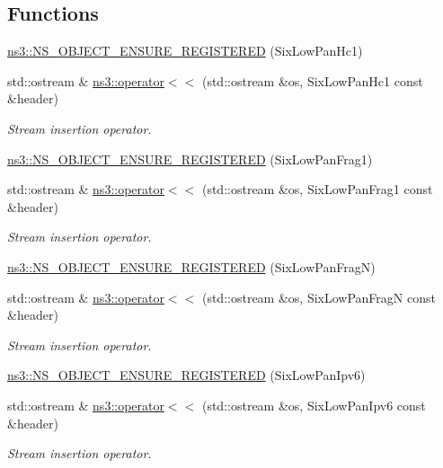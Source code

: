 \subsection*{Functions}
\begin{DoxyCompactItemize}
\item 
\hyperlink{namespacens3_a79c7e17c64bcdec1c8a80aef4aec84e7}{ns3\+::\+N\+S\+\_\+\+O\+B\+J\+E\+C\+T\+\_\+\+E\+N\+S\+U\+R\+E\+\_\+\+R\+E\+G\+I\+S\+T\+E\+R\+ED} (Six\+Low\+Pan\+Hc1)
\item 
std\+::ostream \& \hyperlink{namespacens3_a3206dad5b9c2d4d8bfae82c0a4eef647}{ns3\+::operator$<$$<$} (std\+::ostream \&os, Six\+Low\+Pan\+Hc1 const \&header)
\begin{DoxyCompactList}\small\item\em Stream insertion operator. \end{DoxyCompactList}\item 
\hyperlink{namespacens3_a80ca589a66bcf484fe57e0e4f27bc845}{ns3\+::\+N\+S\+\_\+\+O\+B\+J\+E\+C\+T\+\_\+\+E\+N\+S\+U\+R\+E\+\_\+\+R\+E\+G\+I\+S\+T\+E\+R\+ED} (Six\+Low\+Pan\+Frag1)
\item 
std\+::ostream \& \hyperlink{namespacens3_a0d19c4dfea04a3666706bfda9975e2bf}{ns3\+::operator$<$$<$} (std\+::ostream \&os, Six\+Low\+Pan\+Frag1 const \&header)
\begin{DoxyCompactList}\small\item\em Stream insertion operator. \end{DoxyCompactList}\item 
\hyperlink{namespacens3_a112a9602bc18476e9cb84c10d6565321}{ns3\+::\+N\+S\+\_\+\+O\+B\+J\+E\+C\+T\+\_\+\+E\+N\+S\+U\+R\+E\+\_\+\+R\+E\+G\+I\+S\+T\+E\+R\+ED} (Six\+Low\+Pan\+FragN)
\item 
std\+::ostream \& \hyperlink{namespacens3_acc02db5ba7ef3fd811d8f37b023ab3e5}{ns3\+::operator$<$$<$} (std\+::ostream \&os, Six\+Low\+Pan\+FragN const \&header)
\begin{DoxyCompactList}\small\item\em Stream insertion operator. \end{DoxyCompactList}\item 
\hyperlink{namespacens3_a9d0dc512b68def5f44175e62e109f1d8}{ns3\+::\+N\+S\+\_\+\+O\+B\+J\+E\+C\+T\+\_\+\+E\+N\+S\+U\+R\+E\+\_\+\+R\+E\+G\+I\+S\+T\+E\+R\+ED} (Six\+Low\+Pan\+Ipv6)
\item 
std\+::ostream \& \hyperlink{namespacens3_a7a1fc9b56c1a8140d9d819229d7a2f7c}{ns3\+::operator$<$$<$} (std\+::ostream \&os, Six\+Low\+Pan\+Ipv6 const \&header)
\begin{DoxyCompactList}\small\item\em Stream insertion operator. \end{DoxyCompactList}\item 

\end{DoxyCompactItemize}
